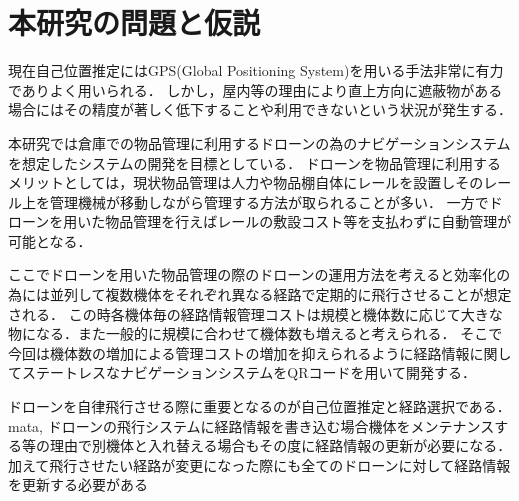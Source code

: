 \section{本研究の問題と仮説}
現在自己位置推定にはGPS(Global Positioning System)を用いる手法非常に有力でありよく用いられる．
しかし，屋内等の理由により直上方向に遮蔽物がある場合にはその精度が著しく低下することや利用できないという状況が発生する．

本研究では倉庫での物品管理に利用するドローンの為のナビゲーションシステムを想定したシステムの開発を目標としている．
ドローンを物品管理に利用するメリットとしては，現状物品管理は人力や物品棚自体にレールを設置しそのレール上を管理機械が移動しながら管理する方法が取られることが多い．
一方でドローンを用いた物品管理を行えばレールの敷設コスト等を支払わずに自動管理が可能となる．

ここでドローンを用いた物品管理の際のドローンの運用方法を考えると効率化の為には並列して複数機体をそれぞれ異なる経路で定期的に飛行させることが想定される．
この時各機体毎の経路情報管理コストは規模と機体数に応じて大きな物になる．また一般的に規模に合わせて機体数も増えると考えられる．
そこで今回は機体数の増加による管理コストの増加を抑えられるように経路情報に関してステートレスなナビゲーションシステムをQRコードを用いて開発する．

ドローンを自律飛行させる際に重要となるのが自己位置推定と経路選択である．
mata,
ドローンの飛行システムに経路情報を書き込む場合機体をメンテナンスする等の理由で別機体と入れ替える場合もその度に経路情報の更新が必要になる．
加えて飛行させたい経路が変更になった際にも全てのドローンに対して経路情報を更新する必要がある
